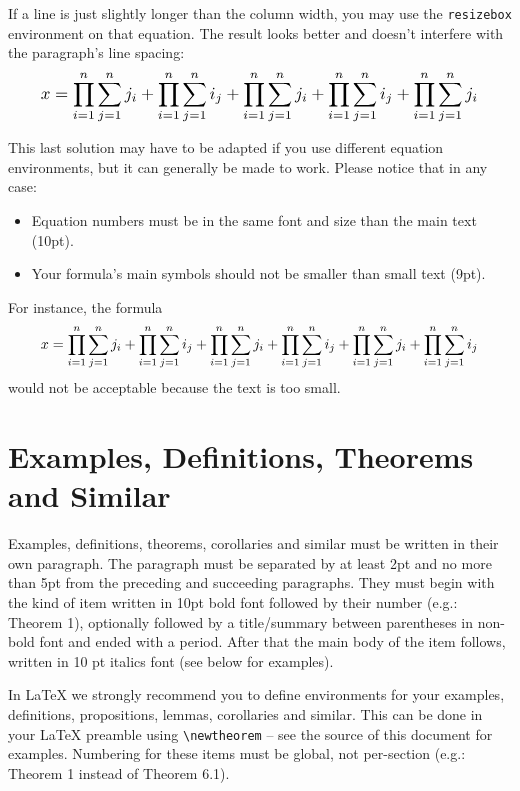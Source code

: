 \documentclass{article}
\begin{document}
If a line is just slightly longer than the column width, you may use the
\texttt{resizebox} environment on that equation. The result looks better and
doesn't interfere with the paragraph's line spacing: %
\begin{equation}
\resizebox{.91\linewidth}{!}{$
    \displaystyle
    x = \prod_{i=1}^n \sum_{j=1}^n j_i + \prod_{i=1}^n \sum_{j=1}^n i_j + \prod_{i=1}^n \sum_{j=1}^n j_i + \prod_{i=1}^n \sum_{j=1}^n i_j + \prod_{i=1}^n \sum_{j=1}^n j_i
$}
\end{equation}%

This last solution may have to be adapted if you use different equation environments, but it can generally be made to work. Please notice that in any case:

\begin{itemize}
\item Equation numbers must be in the same font and size than the main text
  (10pt).
\item Your formula's main symbols should not be smaller than {\small small}
  text (9pt).
\end{itemize}

For instance, the formula
%
\begin{equation}
    \resizebox{.91\linewidth}{!}{$
    \displaystyle
    x = \prod_{i=1}^n \sum_{j=1}^n j_i + \prod_{i=1}^n \sum_{j=1}^n i_j + \prod_{i=1}^n \sum_{j=1}^n j_i + \prod_{i=1}^n \sum_{j=1}^n i_j + \prod_{i=1}^n \sum_{j=1}^n j_i + \prod_{i=1}^n \sum_{j=1}^n i_j
$}
\end{equation}
%
would not be acceptable because the text is too small.

\section{Examples, Definitions, Theorems and Similar}

Examples, definitions, theorems, corollaries and similar must be written in
their own paragraph. The paragraph must be separated by at least 2pt and no
more than 5pt from the preceding and succeeding paragraphs. They must begin
with the kind of item written in 10pt bold font followed by their number (e.g.:
Theorem 1), optionally followed by a title/summary between parentheses in
non-bold font and ended with a period. After that the main body of the item
follows, written in 10 pt italics font (see below for examples).

In \LaTeX{} we strongly recommend you to define environments for your examples,
definitions, propositions, lemmas, corollaries and similar. This can be done in
your \LaTeX{} preamble using \texttt{\textbackslash{}newtheorem} -- see the
source of this document for examples. Numbering for these items must be global,
not per-section (e.g.: Theorem 1 instead of Theorem 6.1).
\end{document}

